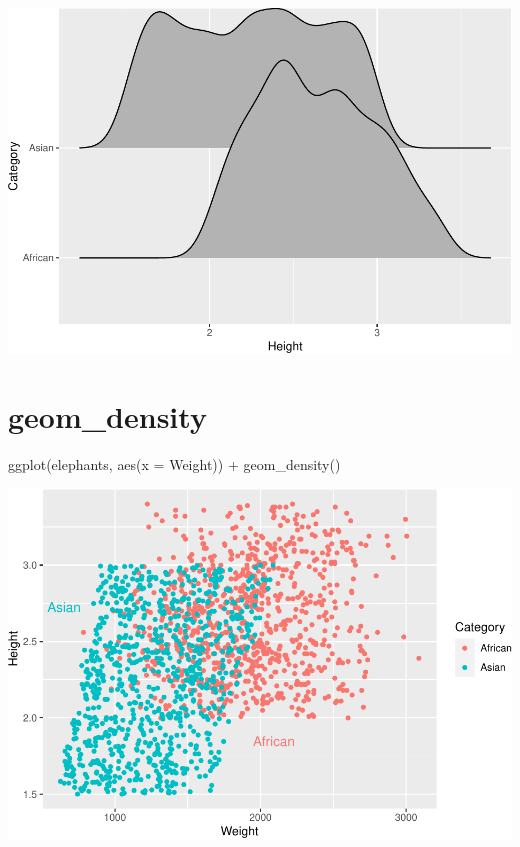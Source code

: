 \documentclass[
]{book}
\newenvironment{Shaded}{\begin{snugshade}}{\end{snugshade}}
\newcommand{\AttributeTok}[1]{\textcolor[rgb]{0.77,0.63,0.00}{#1}}
\newcommand{\FunctionTok}[1]{\textcolor[rgb]{0.00,0.00,0.00}{#1}}
\newcommand{\NormalTok}[1]{#1}
\newcommand{\SpecialCharTok}[1]{\textcolor[rgb]{0.00,0.00,0.00}{#1}}
\begin{document}
\includegraphics{Data-Visualisation-geom-Encyclopedia_files/figure-latex/unnamed-chunk-34-1.pdf}

\hypertarget{geom_density}{%
\section{geom\_density}\label{geom_density}}

\begin{Shaded}
\begin{Highlighting}[]
\FunctionTok{ggplot}\NormalTok{(elephants, }\FunctionTok{aes}\NormalTok{(}\AttributeTok{x =}\NormalTok{ Weight)) }\SpecialCharTok{+} 
  \FunctionTok{geom\_density}\NormalTok{()}
\end{Highlighting}
\end{Shaded}

\includegraphics{Data-Visualisation-geom-Encyclopedia_files/figure-latex/unnamed-chunk-35-1.pdf}
\end{document}
